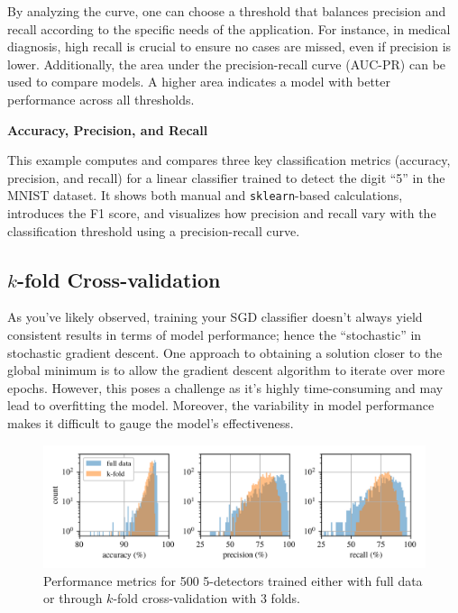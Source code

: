 \documentclass[12pt,letter]{article}
\begin{document}
By analyzing the curve, one can choose a threshold that balances precision and recall according to the specific needs of the application. For instance, in medical diagnosis, high recall is crucial to ensure no cases are missed, even if precision is lower. Additionally, the area under the precision-recall curve (AUC-PR) can be used to compare models. A higher area indicates a model with better performance across all thresholds.

\begin{example}
\textbf{Accuracy, Precision, and Recall}

\noindent This example computes and compares three key classification metrics (accuracy, precision, and recall) for a linear classifier trained to detect the digit ``5'' in the MNIST dataset. It shows both manual and \texttt{sklearn}-based calculations, introduces the F1 score, and visualizes how precision and recall vary with the classification threshold using a precision-recall curve.
\end{example}


\subsection{$k$-fold Cross-validation}
As you've likely observed, training your SGD classifier doesn't always yield consistent results in terms of model performance; hence the ``stochastic'' in stochastic gradient descent. One approach to obtaining a solution closer to the global minimum is to allow the gradient descent algorithm to iterate over more epochs. However, this poses a challenge as it's highly time-consuming and may lead to overfitting the model. Moreover, the variability in model performance makes it difficult to gauge the model's effectiveness.

\begin{figure}[H]
    \centering
    \includegraphics[width=6.5in]{../figures/k-fold_cross-validation_trials}
    \caption{Performance metrics for 500 5-detectors trained either with full data or through $k$-fold cross-validation with 3 folds.}
    \label{fig:k-fold_cross-validation_trials}
\end{figure}
\end{document}
